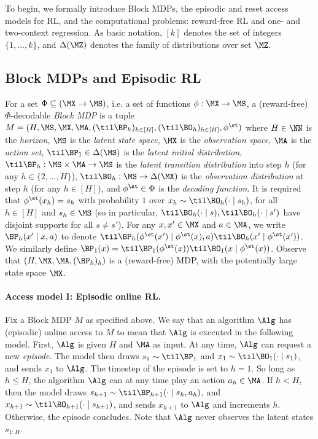 To begin, we formally introduce Block MDPs, the episodic and reset access models for RL, and the computational problems: reward-free RL and one- and two-context regression. As basic notation, $[k]$ denotes the set of integers $\{1,\dots,k\}$, and $\Delta(\MZ)$ denotes the family of distributions over set $\MZ$.

\subsection{Block MDPs and Episodic RL}

For a set $\Phi \subseteq (\MX\to\MS)$, i.e. a set of functions $\phi:\MX\to\MS$, a (reward-free) $\Phi$-decodable \emph{Block MDP} \citep{du2019provably} is a tuple
$
M = (H, \MS, \MX, \MA, (\til \BP_h)_{h \in [H]}, (\til\BO_h)_{h\in[H]}, \phi^\st)
$
where $H \in \NN$ is the \emph{horizon}, $\MS$ is the \emph{latent state space}, $\MX$ is the \emph{observation space}, $\MA$ is the \emph{action set}, $\til \BP_1 \in \Delta(\MS)$ is the \emph{latent initial distribution}, $\til \BP_h: \MS \times \MA \to \MS$ is the \emph{latent transition distribution} into step $h$ (for any $h \in \{2,\dots,H\}$), $\til \BO_h: \MS \to \Delta(\MX)$ is the \emph{observation distribution} at step $h$ (for any $h \in [H]$), and $\phi^\st\in\Phi$ is the \emph{decoding function}. %
It is required that $\phi^\st(x_h) = s_h$ with probability $1$ over $x_h \sim \til \BO_h(\cdot\mid{}s_h)$, for all $h \in [H]$ and $s_h \in \MS$ (so in particular, $\til \BO_h(\cdot \mid{} s), \til \BO_h(\cdot \mid{} s')$ have disjoint supports for all $s \neq s'$).
For any $x,x'\in\MX$ and $a \in \MA$, we write $\BP_h(x'\mid{}x,a)$ to denote $\til\BP_h(\phi^\st(x')\mid{}\phi^\st(x),a) \til\BO_h(x'\mid{}\phi^\st(x'))$. We similarly define $\BP_1(x) = \til\BP_1(\phi^\st(x))\til\BO_1(x\mid{}\phi^\st(x))$. Observe that $(H, \MX, \MA,(\BP_h)_h)$ is a (reward-free) MDP, with the potentially large state space $\MX$.

\paragraph{Access model I: Episodic online RL.} Fix a Block MDP $M$ as specified above. We say that an algorithm $\Alg$ has (episodic) online access to $M$ to mean that $\Alg$ is executed in the following model. First, $\Alg$ is given $H$ and $\MA$ as input. At any time, $\Alg$ can request a new \emph{episode}. The model then draws $s_1 \sim \til \BP_1$ and $x_1 \sim \til\BO_1(\cdot\mid{}s_1)$, and sends $x_1$ to $\Alg$. The timestep of the episode is set to $h=1$. So long as $h \leq H$, the algorithm $\Alg$ can at any time play an action $a_h \in \MA$. If $h < H$, then the model draws $s_{h+1} \sim \til \BP_{h+1}(\cdot\mid{}s_h, a_h)$, and $x_{h+1} \sim \til\BO_{h+1}(\cdot\mid{}s_{h+1})$, and sends $x_{h+1}$ to $\Alg$ and increments $h$. Otherwise, the episode concludes. Note that $\Alg$ never observes the latent states $s_{1:H}$.

